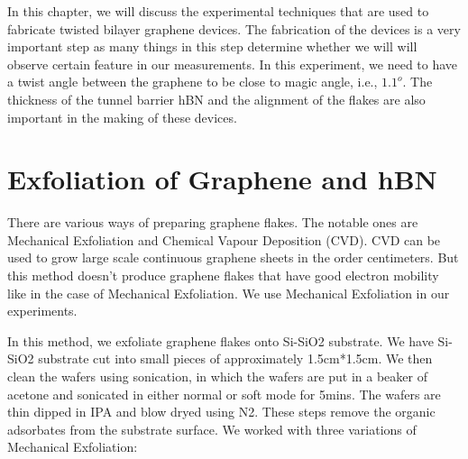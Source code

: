 In this chapter, we will discuss the experimental techniques that are used to fabricate twisted bilayer graphene devices. The fabrication of the devices is a very important step as many things in this step determine whether we will will observe certain feature in our measurements. In this experiment, we need to have a twist angle between the graphene to be close to magic angle, i.e., $1.1 ^o$. The thickness of the tunnel barrier hBN and the alignment of the flakes are also important in the making of these devices.

\section{Exfoliation of Graphene and hBN}

There are various ways of preparing graphene flakes. \cite{Bhuyan2016} The notable ones are Mechanical Exfoliation and Chemical Vapour Deposition (CVD). CVD can be used to grow large scale continuous graphene sheets in the order centimeters. But this method doesn't produce graphene flakes that have good electron mobility like in the case of Mechanical Exfoliation. We use Mechanical Exfoliation in our experiments.

In this method, we exfoliate graphene flakes onto Si-SiO2 substrate. We have Si-SiO2 substrate cut into small pieces of approximately 1.5cm*1.5cm. We then clean the wafers using sonication, in which the wafers are put in a beaker of acetone and sonicated in either normal or soft mode for 5mins. The wafers are thin dipped in IPA and blow dryed using N2. These steps remove the organic adsorbates from the substrate surface. We worked with three variations of Mechanical Exfoliation:

